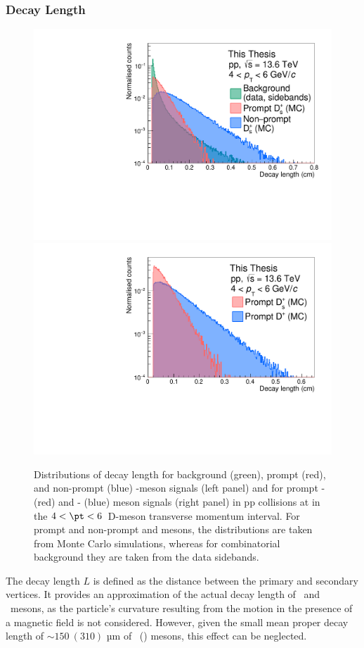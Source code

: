 \subsubsection{Decay Length}
\begin{figure}
    \centering
    \includegraphics[width=0.48\linewidth]{Figures/Chapter 4/DecayLength.pdf}
    \includegraphics[width=0.48\linewidth]{Figures/Chapter 4/DecayLengthDsDPlus.pdf}
    \caption{Distributions of decay length for background (green), prompt (red), and non-prompt (blue) \ds-meson signals (left panel) and for prompt \ds- (red) and \dpl- (blue) meson signals (right panel) in pp collisions at \thirteen in the $4 < \pt < 6$~\gevc D-meson transverse momentum interval. For prompt and non-prompt \ds and \dpl mesons, the distributions are taken from Monte Carlo
    simulations, whereas for combinatorial background they are taken from the data sidebands.}
    \label{fig:DecayLength}
\end{figure}
The decay length $L$ is defined as the distance between the primary and secondary vertices. It provides an approximation of the actual decay length of \ds\ and \dpl\ mesons, as the particle's curvature resulting from the motion in the presence of a magnetic field is not considered. However, given the small mean proper decay length of $\sim 150~(310)$ µm of \ds\ (\dpl) mesons, this effect can be neglected. 

